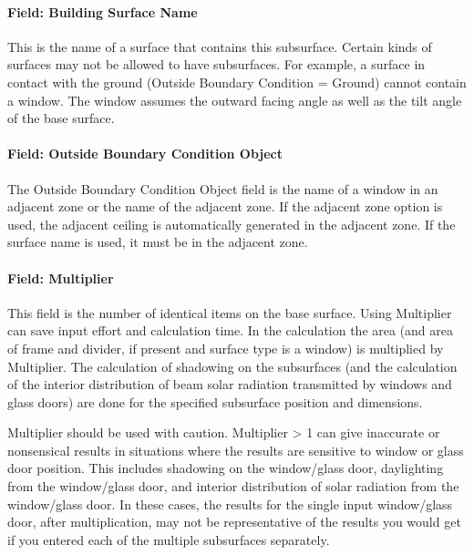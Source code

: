 \paragraph{Field: Building Surface Name}\label{field-building-surface-name-3}

This is the name of a surface that contains this subsurface. Certain kinds of surfaces may not be allowed to have subsurfaces. For example, a surface in contact with the ground (Outside Boundary Condition = Ground) cannot contain a window. The window assumes the outward facing angle as well as the tilt angle of the base surface.

\paragraph{Field: Outside Boundary Condition Object}\label{field-outside-boundary-condition-object-3}

The Outside Boundary Condition Object field is the name of a window in an adjacent zone or the name of the adjacent zone. If the adjacent zone option is used, the adjacent ceiling is automatically generated in the adjacent zone. If the surface name is used, it must be in the adjacent zone.

\paragraph{Field: Multiplier}\label{field-multiplier-4}

This field is the number of identical items on the base surface. Using Multiplier can save input effort and calculation time. In the calculation the area (and area of frame and divider, if present and surface type is a window) is multiplied by Multiplier. The calculation of shadowing on the subsurfaces (and the calculation of the interior distribution of beam solar radiation transmitted by windows and glass doors) are done for the specified subsurface position and dimensions.

Multiplier should be used with caution. Multiplier \textgreater{} 1 can give inaccurate or nonsensical results in situations where the results are sensitive to window or glass door position. This includes shadowing on the window/glass door, daylighting from the window/glass door, and interior distribution of solar radiation from the window/glass door. In these cases, the results for the single input window/glass door, after multiplication, may not be representative of the results you would get if you entered each of the multiple subsurfaces separately.


